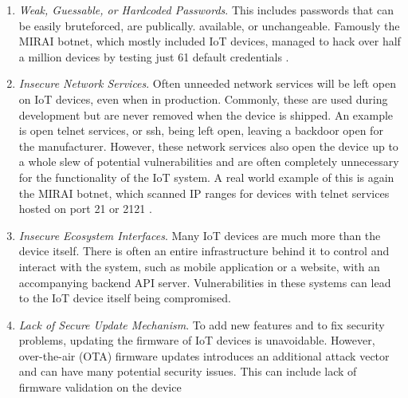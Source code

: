 \begin{enumerate}
    \item \textit{Weak, Guessable, or Hardcoded Passwords}. This includes passwords that can be easily bruteforced, are publically. available, or unchangeable. Famously the MIRAI botnet, which mostly included IoT devices, managed to hack over half a million devices by testing just 61 default credentials \cite{understanding-mirai}.
    
    \item \textit{Insecure Network Services}. Often unneeded network services will be left open on IoT devices, even when in production. Commonly, these are used during development but are never removed when the device is shipped. An example is open telnet services, or ssh, being left open, leaving a backdoor open for the manufacturer. However, these network services also open the device up to a whole slew of potential vulnerabilities and are often completely unnecessary for the functionality of the IoT system. A real world example of this is again the MIRAI botnet, which scanned IP ranges for devices with telnet services hosted on port 21 or 2121 \cite{understanding-mirai}.
    
    \item \textit{Insecure Ecosystem Interfaces}. Many IoT devices are much more than the device itself. There is often an entire infrastructure behind it to control and interact with the system, such as mobile application or a website, with an accompanying backend API server. Vulnerabilities in these systems can lead to the IoT device itself being compromised.
    
    \item \textit{Lack of Secure Update Mechanism}. To add new features and to fix security problems, updating the firmware of IoT devices is unavoidable. However, over-the-air (OTA) firmware updates introduces an additional attack vector and can have many potential security issues. This can include lack of firmware validation on the device 
    

\end{enumerate}
